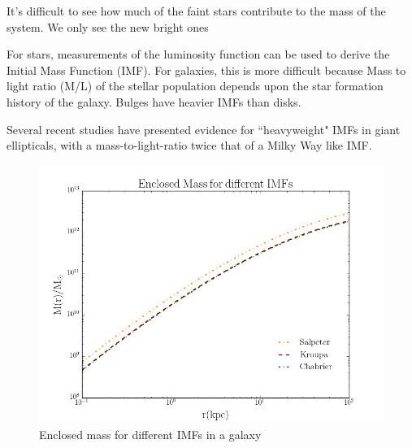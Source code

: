 It's difficult to see how much of the faint stars contribute to the mass of the system. We only see the new bright ones

For stars, measurements of the luminosity function can be used to derive the Initial Mass Function (IMF). For galaxies, this is more difficult because Mass to light ratio (M/L) of the stellar population depends upon the star formation history of the galaxy. Bulges have heavier IMFs than disks.

Several recent studies have presented evidence for ``heavyweight" IMFs in giant ellipticals, with a mass-to-light-ratio twice that of a Milky Way like IMF.    
   
\begin{figure}[H]
\centering
\includegraphics[width=12cm]{images/Enclosed_Mass_IMFs.png}
\caption[Enclosed mass for different IMFs in a galaxy]{Enclosed mass for different IMFs in a galaxy}
\end{figure}   
   
\newpage
